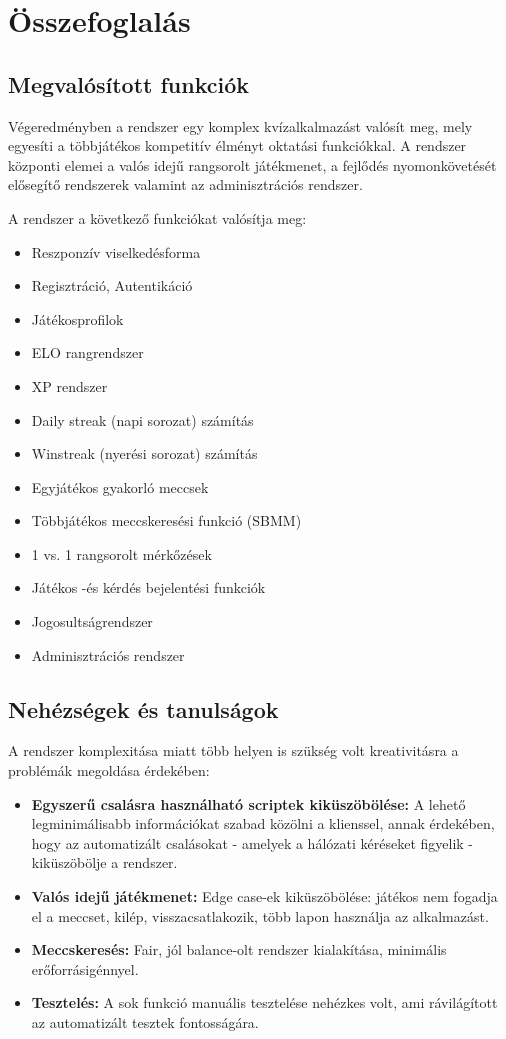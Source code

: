 \chapter{Összefoglalás}

\section{Megvalósított funkciók}
Végeredményben a rendszer egy komplex kvízalkalmazást valósít meg, mely egyesíti a többjátékos kompetitív élményt oktatási funkciókkal. A rendszer központi elemei a valós idejű rangsorolt játékmenet, a fejlődés nyomonkövetését elősegítő rendszerek valamint az adminisztrációs rendszer.

A rendszer a következő funkciókat valósítja meg:
\begin{itemize}
    \item Reszponzív viselkedésforma
    \item Regisztráció, Autentikáció
    \item Játékosprofilok
    \item ELO rangrendszer
    \item XP rendszer
    \item Daily streak (napi sorozat) számítás
    \item Winstreak (nyerési sorozat) számítás
    \item Egyjátékos gyakorló meccsek
    \item Többjátékos meccskeresési funkció (SBMM)
    \item 1 vs. 1 rangsorolt mérkőzések
    \item Játékos -és kérdés bejelentési funkciók
    \item Jogosultságrendszer
    \item Adminisztrációs rendszer
\end{itemize}

\section{Nehézségek és tanulságok}
A rendszer komplexitása miatt több helyen is szükség volt kreativitásra a problémák megoldása érdekében:

\begin{itemize}
    \item \textbf{Egyszerű csalásra használható scriptek kiküszöbölése:} A lehető legminimálisabb információkat szabad közölni a klienssel, annak érdekében, hogy az automatizált csalásokat - amelyek a hálózati kéréseket figyelik - kiküszöbölje a rendszer.
    \item \textbf{Valós idejű játékmenet:} Edge case-ek kiküszöbölése: játékos nem fogadja el a meccset, kilép, visszacsatlakozik, több lapon használja az alkalmazást. 
    \item \textbf{Meccskeresés:} Fair, jól balance-olt rendszer kialakítása, minimális erőforrásigénnyel.
    \item \textbf{Tesztelés:} A sok funkció manuális tesztelése nehézkes volt, ami rávilágított az automatizált tesztek fontosságára.
\end{itemize}

